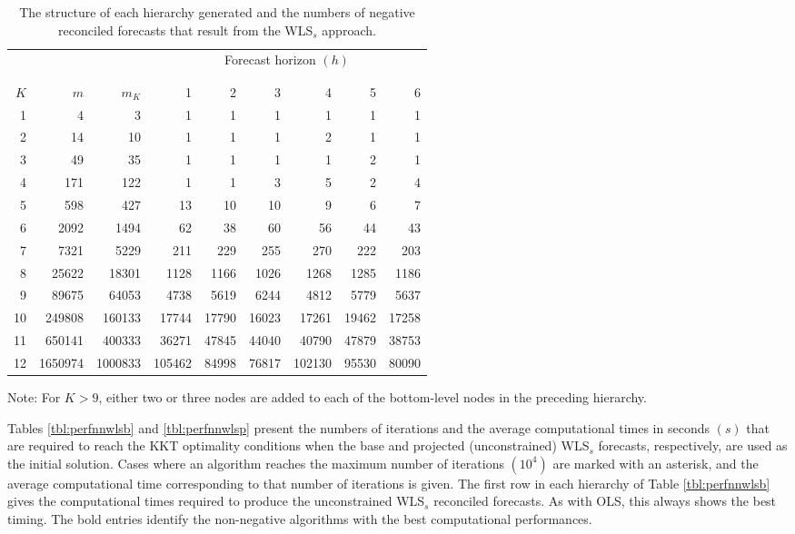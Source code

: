 \documentclass[11pt]{article}
\newcommand{\0}{\phantom{0}}
\begin{document}
\begin{table}[ht]
	\caption{The structure of each hierarchy generated and the numbers of negative reconciled forecasts that result from the WLS$_{s}$ approach.}
	\label{tbl:negstrwls}
	\centering
	\begin{threeparttable}
		\begin{tabular}{rrrrrrrrr}
			\toprule
			& & & \multicolumn{6}{c}{Forecast horizon $(h)$}\\[-0.3cm]\\\cline{4-9}\\[-0.3cm]
			$K$ & $m$ & $m_{K}$ & 1 & 2 & 3 & 4 & 5 & 6\\ 
			\midrule
			1 & 4 & 3 & 1 & 1 & 1 & 1 & 1 & 1\\
			2 & 14 & 10 & 1 & 1 & 1 & 2 & 1 & 1 \\
			3 & 49 & 35 & 1 & 1 & 1 & 1 & 2 & 1 \\
			4 & 171 & 122 & 1 & 1 & 3 & 5 & 2 & 4 \\
			5 & 598 & 427 & 13 & 10 & 10 & 9 & 6 & 7 \\
			6 & 2092 & 1494 & 62 & 38 & 60 & 56 & 44 & 43 \\
			7 & 7321 & 5229 & 211 & 229 & 255 & 270 & 222 & 203 \\
			8 & 25622 & 18301 & 1128 & 1166 & 1026 & 1268 & 1285 & 1186 \\
			9 & 89675 & 64053 & 4738 & 5619 & 6244 & 4812 & 5779 & 5637 \\
			10 & 249808 & 160133 & 17744 & 17790 & 16023 & 17261 & 19462 & 17258 \\
			11 & 650141 & 400333 & 36271 & 47845 & 44040 & 40790 & 47879 & 38753 \\
			12 & 1650974 & 1000833 & 105462 & 84998 & 76817 & 102130 & 95530 & 80090 \\
			\bottomrule
		\end{tabular}
		\begin{tablenotes}
			\item [] Note: For $K > 9$, either two or three nodes are added to each of the bottom-level nodes in the preceding hierarchy.
		\end{tablenotes}
	\end{threeparttable}
\end{table}

Tables \ref{tbl:perfnnwlsb} and \ref{tbl:perfnnwlsp} present the numbers of iterations and the average computational times in seconds $(s)$ that are required to reach the KKT optimality conditions when the base and projected (unconstrained) WLS$_{s}$ forecasts, respectively, are used as the initial solution. Cases where an algorithm reaches the maximum number of iterations $(10^{4})$ are marked with an asterisk, and the average computational time corresponding to that number of iterations is given. The first row in each hierarchy of Table \ref{tbl:perfnnwlsb} gives the computational times required to produce the unconstrained WLS$_{s}$ reconciled forecasts. As with OLS, this always shows the best timing. The bold entries identify the non-negative algorithms with the best computational performances. 
\end{document}
